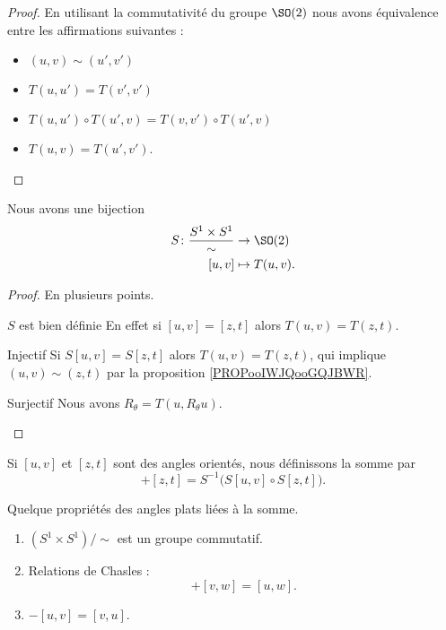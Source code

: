 \begin{proof}
    En utilisant la commutativité du groupe \( \SO(2)\) nous avons équivalence entre les affirmations suivantes :
    \begin{itemize}
        \item \( (u,v)\sim (u',v')\)
        \item \( T(u,u')=T(v',v')\)
        \item \( T(u,u')\circ T(u',v)=T(v,v')\circ T(u',v)\)
        \item
            \( T(u,v)=T(u',v')\).
    \end{itemize}
\end{proof}

\begin{proposition}
    Nous avons une bijection
    \begin{equation}
        \begin{aligned}
            S\colon \frac{ S^1\times S^1 }{ \sim }&\to \SO(2) \\
            [u,v]&\mapsto T(u,v). 
        \end{aligned}
    \end{equation}
\end{proposition}

\begin{proof}
    En plusieurs points.
    \begin{subproof}
    \item[\( S\) est bien définie]
        En effet si \( [u,v]=[z,t]\) alors \( T(u,v)=T(z,t)\).
    \item[Injectif]
        Si \( S[u,v]=S[z,t]\) alors \( T(u,v)=T(z,t)\), qui implique \( (u,v)\sim (z,t)\) par la proposition \ref{PROPooIWJQooGQJBWR}.
    \item[Surjectif]
        Nous avons \( R_{\theta}=T(u,R_{\theta}u)\).
    \end{subproof}
\end{proof}

\begin{definition}
    Si \( [u,v]\) et \( [z,t]\) sont des angles orientés, nous définissons la somme par
    \begin{equation}
        [u,v]+[z,t]=S^{-1}\Big( S[u,v]\circ S[z,t] \Big).
    \end{equation}
\end{definition}

\begin{lemma}       \label{LEMooWISVooYsStJp}
    Quelque propriétés des angles plats liées à la somme.
    \begin{enumerate}
        \item
            \( (S^1\times S^1)/\sim\) est un groupe commutatif.
        \item       \label{ITEMooBKTFooWbEvIU}
            Relations de Chasles :
            \begin{equation}
                [u,v]+[v,w]=[u,w].
            \end{equation}
        \item
            \( -[u,v]=[v,u]\).
    \end{enumerate}
\end{lemma}

